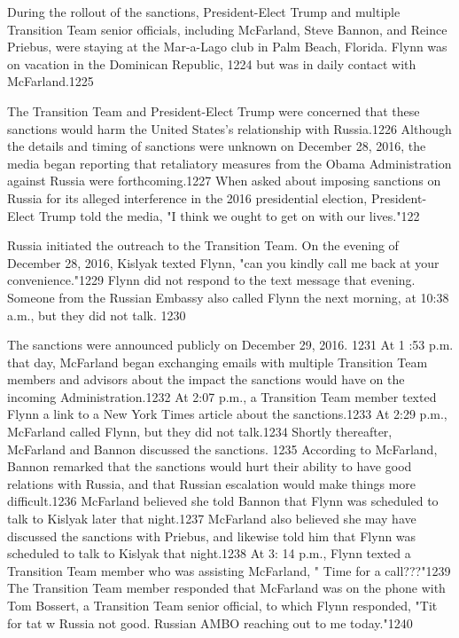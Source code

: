 During the rollout of the sanctions, President-Elect Trump and multiple Transition Team senior officials, including McFarland, Steve Bannon, and Reince Priebus, were staying at the Mar-a-Lago club in Palm Beach, Florida. Flynn was on vacation in the Dominican Republic, 1224 but was in daily contact with McFarland.1225

The Transition Team and President-Elect Trump were concerned that these sanctions would harm the United States's relationship with Russia.1226 Although the details and timing of sanctions were unknown on December 28, 2016,  the media began reporting that retaliatory measures from the Obama Administration against Russia were forthcoming.1227 When asked about imposing sanctions on Russia for its alleged interference in the 2016 presidential election, President-Elect Trump told the media, "I think we ought to get on with our lives."122

Russia initiated the outreach to the Transition Team. On the evening of December 28, 2016, Kislyak texted Flynn, "can you kindly call me back at your convenience."1229 Flynn did not respond to the text message that evening. Someone from the Russian Embassy also called Flynn the next morning, at 10:38 a.m., but they did not talk. 1230

The sanctions were announced publicly on December 29, 2016. 1231 At 1 :53 p.m. that day, McFarland began exchanging emails with multiple Transition Team members and advisors about the impact the sanctions would have on the incoming Administration.1232 At 2:07 p.m., a Transition Team member texted Flynn a  link to a New York Times article about the sanctions.1233 At 2:29 p.m., McFarland called Flynn, but they did not talk.1234 Shortly thereafter, McFarland and Bannon discussed the sanctions. 1235 According to McFarland, Bannon remarked that the sanctions would hurt their ability to have good relations with Russia, and that Russian escalation would make things more difficult.1236 McFarland believed she told Bannon that Flynn was scheduled to talk to Kislyak later that night.1237 McFarland also believed she may have discussed the sanctions with Priebus, and likewise told him that Flynn was scheduled to talk to Kislyak that night.1238 At 3: 14 p.m., Flynn texted a  Transition Team member who was assisting McFarland, " Time for a  call???"1239 The Transition Team member responded that McFarland was on the phone with Tom Bossert, a Transition Team senior official, to which Flynn responded, "Tit for tat w Russia not good. Russian AMBO reaching out to me today."1240


